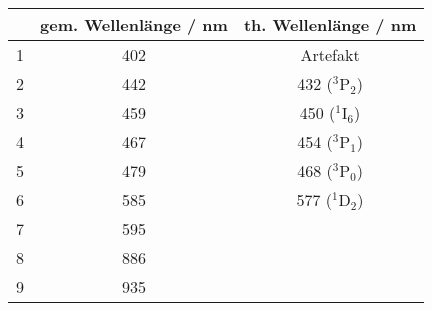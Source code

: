 \begin{center}
\begin{tabular}{|c|c|c|}
\hline
  & gem. Wellenlänge / nm & th. Wellenlänge / nm \\ \hline
1 & 402 & Artefakt \\ \hline
2 & 442 & 432 ($^3$P$_2$) \\ \hline
3 & 459 & 450 ($^1$I$_6$) \\ \hline
4 & 467 & 454 ($^3$P$_1$) \\ \hline
5 & 479 & 468 ($^3$P$_0$) \\ \hline
6 & 585 & 577 ($^1$D$_2$) \\ \hline
7 & 595 &  \\ \hline
8 & 886 &  \\ \hline
9 & 935 &  \\ \hline
\end{tabular}
\end{center}